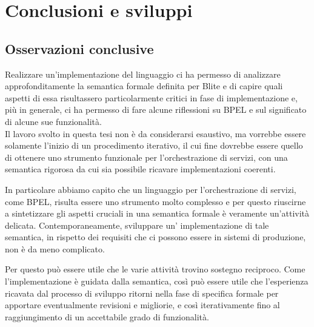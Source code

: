 \chapter{Conclusioni e sviluppi}

\section{Osservazioni conclusive}

Realizzare un'implementazione del linguaggio ci ha permesso di analizzare
approfonditamente la semantica formale definita per Blite e di capire quali
aspetti di essa risultassero particolarmente critici in fase di implementazione
e, più in generale, ci ha permesso di fare alcune riflessioni su BPEL e
sul significato di alcune sue funzionalità.
\\

Il lavoro svolto in questa tesi non è da considerarsi esaustivo, 
ma vorrebbe essere solamente l'inizio di un procedimento iterativo, il cui fine
dovrebbe essere quello di ottenere uno strumento funzionale per
l'orchestrazione di servizi, con una semantica rigorosa da cui sia possibile
ricavare implementazioni coerenti. 

In particolare abbiamo capito che un linguaggio per l'orchestrazione di servizi,
come BPEL, risulta essere uno strumento molto complesso e per questo
riuscirne a sintetizzare gli aspetti cruciali in una semantica formale è
veramente un'attività delicata. Contemporaneamente, sviluppare un'
implementazione di tale semantica, in rispetto dei requisiti che ci possono
essere in sistemi di produzione, non è da meno complicato. 

Per questo può essere utile che le varie attività trovino sostegno reciproco.
Come l'implementazione è guidata dalla semantica, così può essere utile che
l'esperienza ricavata dal processo di sviluppo ritorni nella fase di specifica
formale per apportare eventualmente revisioni e migliorie, e così
iterativamente fino al raggiungimento di un accettabile grado di funzionalità.
\\

% 

